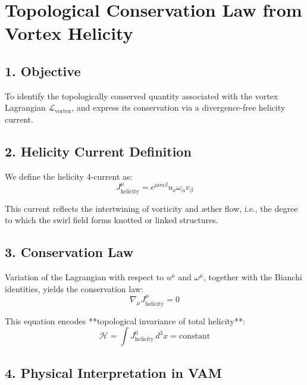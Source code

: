 \documentclass[twocolumn,aps,pre,floatfix,nofootinbib]{revtex4-2}
\begin{document}
    \section*{Topological Conservation Law from Vortex Helicity}

    \subsection*{1. Objective}

    To identify the topologically conserved quantity associated with the vortex Lagrangian \( \mathcal{L}_{\text{vortex}} \), and express its conservation via a divergence-free helicity current.

    \subsection*{2. Helicity Current Definition}

    We define the helicity 4-current as:
    \begin{equation}
        J^\mu_{\text{helicity}} = \epsilon^{\mu\nu\alpha\beta} u_\nu \omega_\alpha v_\beta
    \end{equation}

    This current reflects the intertwining of vorticity and æther flow, i.e., the degree to which the swirl field forms knotted or linked structures.

    \subsection*{3. Conservation Law}

    Variation of the Lagrangian with respect to \( u^\mu \) and \( \omega^\mu \), together with the Bianchi identities, yields the conservation law:
    \begin{equation}
        \nabla_\mu J^\mu_{\text{helicity}} = 0
    \end{equation}

    This equation encodes **topological invariance of total helicity**:
    \begin{equation}
        \mathcal{H} = \int J^0_{\text{helicity}} \, d^3x = \text{constant}
    \end{equation}

    \subsection*{4. Physical Interpretation in VAM}
\end{document}
